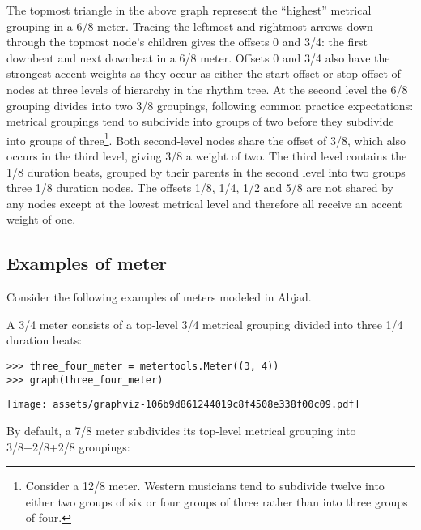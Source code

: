 The topmost triangle in the above graph represent the \enquote{highest}
metrical grouping in a 6/8 meter. Tracing the leftmost and rightmost arrows
down through the topmost node's children gives the offsets 0 and 3/4: the first
downbeat and next downbeat in a 6/8 meter. Offsets 0 and 3/4 also have the
strongest accent weights as they occur as either the start offset or stop
offset of nodes at three levels of hierarchy in the rhythm tree. At the second
level the 6/8 grouping divides into two 3/8 groupings, following common
practice expectations: metrical groupings tend to subdivide into groups of two
before they subdivide into groups of three\footnote{Consider a 12/8 meter.
Western musicians tend to subdivide twelve into either two groups of six or
four groups of three rather than into three groups of four.}. Both second-level
nodes share the offset of 3/8, which also occurs in the third level, giving 3/8
a weight of two. The third level contains the 1/8 duration beats, grouped by
their parents in the second level into two groups three 1/8 duration nodes. The
offsets 1/8, 1/4, 1/2 and 5/8 are not shared by any nodes except at the lowest
metrical level and therefore all receive an accent weight of one.

\subsection{Examples of meter} %

Consider the following examples of meters modeled in Abjad.

A 3/4 meter consists of a top-level 3/4 metrical grouping divided into three
1/4 duration beats:

\begin{comment}
<abjad>
three_four_meter = metertools.Meter((3, 4))
graph(three_four_meter)
</abjad>
\end{comment}

\begin{singlespacing}
\vspace{-0.5\baselineskip}
\begin{lstlisting}
>>> three_four_meter = metertools.Meter((3, 4))
>>> graph(three_four_meter)
\end{lstlisting}
\noindent\texttt{[image: assets/graphviz-106b9d861244019c8f4508e338f00c09.pdf]}
\end{singlespacing}

\noindent By default, a 7/8 meter subdivides its top-level metrical grouping
into 3/8+2/8+2/8 groupings:

